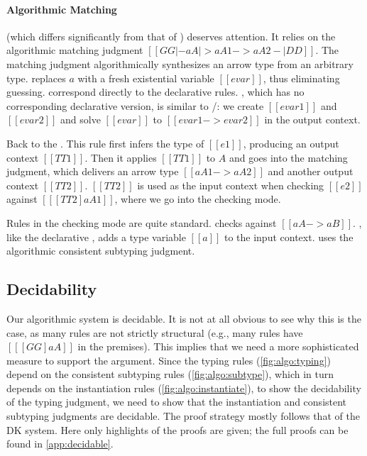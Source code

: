 \paragraph{Algorithmic Matching}
 (which differs significantly from that of \cite{dunfield2013complete}) deserves
attention. It relies on the algorithmic matching judgment $[[ GG |- aA |> aA1 ->
aA2 -| DD ]]$. The matching judgment algorithmically synthesizes an arrow type from an
arbitrary type.  replaces $a$ with a fresh existential variable
$[[evar]]$, thus eliminating guessing.  correspond
directly to the declarative rules. , which has no corresponding
declarative version, is similar to /: we create
$[[evar1]]$ and $[[evar2]]$ and solve $[[evar]] $ to $ [[evar1 -> evar2]]$ in the output context.

Back to the . This rule first infers the type of $[[e1]]$, producing an output
context $[[TT1]]$. Then it applies $[[TT1]]$ to $A$ and goes into the matching
judgment, which delivers an arrow type $[[aA1 -> aA2]]$ and another output
context $[[TT2]]$. $[[TT2]]$ is used as the input context when checking $[[e2]]$
against $[[ [TT2]aA1 ]]$, where we go into the checking mode.


Rules in the checking mode are quite standard.  checks against
$[[aA -> aB]]$. , like the declarative ,
adds a type variable $[[a]]$ to the input context. %
 uses the algorithmic consistent subtyping judgment.



\subsection{Decidability}

Our algorithmic system is decidable. It is not at all obvious to see
why this is the case, as many rules
are not strictly structural (e.g., many rules have $[[ [GG]aA ]]$ in the
premises). This implies that we need a more sophisticated measure to
support the argument. Since the typing rules (\cref{fig:algo:typing}) depend on
the consistent subtyping rules (\cref{fig:algo:subtype}), which in turn depends
on the instantiation rules (\cref{fig:algo:instantiate}), to show the
decidability of the typing judgment, we need to show that the instantiation and
consistent subtyping judgments are decidable. The proof strategy mostly follows
that of the DK system. Here only highlights of the proofs are given; the full proofs can be found
in \cref{app:decidable}.



